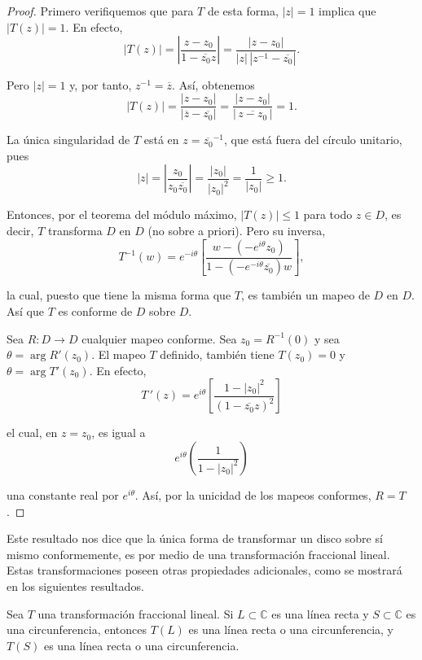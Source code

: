 \begin{proof}
Primero verifiquemos que para $T$ de esta forma, $|z| = 1$ implica que $|T(z)| = 1$. En efecto,
$$|T(z)| = \left|\frac{z-z_0}{1-\overline{z_0} z} \right| = \frac{|z-z_0|}{|z| \,|z^{-1} - \overline{z_0}|}.$$

Pero $|z| = 1$ y, por tanto, $z^{-1} = \overline{z}$. Así, obtenemos
$$|T(z)|= \frac{|z-z_0|}{|\overline{z} - \overline{z_0}|} = \frac{|z-z_0|}{|\,\overline{z-z_0}\,|} = 1.$$

La única singularidad de $T$ está en $z = \overline{z_0}^{-1}$, que está fuera del círculo unitario, pues
$$|z| = \left|\frac{z_0}{z_0 \overline{z_0}} \right| = \frac{|z_0|}{|z_0|^2} = \frac{1}{|z_0|} \geq 1.$$

Entonces, por el teorema del módulo máximo, $|T(z)| \leq 1$ para todo $z \in D$, es decir, $T$ transforma $D$ en $D$ (no sobre a priori). Pero su inversa,
$$T^{-1}(w) = e^{-i\theta} \left[\frac{w - (-e^{i\theta}z_0)}{1-(-e^{-i\theta} \overline{z_0})w} \right],$$

la cual, puesto que tiene la misma forma que $T$, es también un mapeo de $D$ en $D$. Así que $T$ es conforme de $D$ sobre $D$.

Sea $R: D \rightarrow D$ cualquier mapeo conforme. Sea $z_0 = R^{-1}(0)$ y sea $\theta = \arg R'(z_0)$. El mapeo $T$ definido, también tiene $T(z_0) = 0$ y  $\theta = \arg T'(z_0)$. En efecto,
$$T\,'(z) = e^{i\theta} \left[ \frac{1-|z_0|^{2}}{(1-\overline{z_0} z)^2} \right]$$

el cual, en $z = z_0$, es igual a
$$e^{i\theta} \left(\frac{1}{1-|z_0|^2} \right)$$

una constante real por $e^{i\theta}$. Así, por la unicidad de los mapeos conformes, $R = T$.
\end{proof}

Este resultado nos dice que la única forma de transformar un disco sobre sí mismo conformemente, es por medio de una transformación fraccional lineal. Estas transformaciones poseen otras propiedades adicionales, como se mostrará en los siguientes resultados.

\begin{propo}
Sea $T$ una transformación fraccional lineal. Si $L \subset \mathbb{C}$ es una línea recta y $S \subset \mathbb{C}$ es una circunferencia, entonces $T(L)$ es una línea recta o una circunferencia, y $T(S)$ es una línea recta o una circunferencia.
\end{propo}

